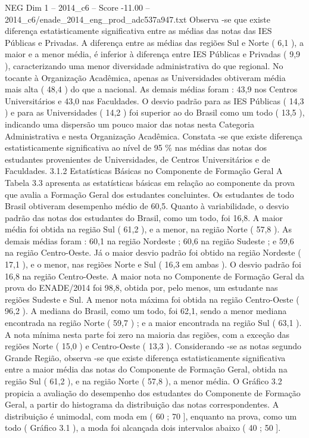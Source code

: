 \begin{textsample}{NEG Dim 1 – 2014\_c6 – Score -11.00 – 2014\_c6/enade\_2014\_eng\_prod\_adc537a947.txt}
Observa -se que existe diferença estatisticamente significativa entre as médias das notas das IES Públicas e Privadas.
A diferença entre as médias das regiões Sul e Norte ( 6,1 ), a maior e a menor média, é inferior à diferença entre IES Públicas e Privadas ( 9,9 ), caracterizando uma menor diversidade administrativa do que regional.
No tocante à Organização Acadêmica, apenas as Universidades obtiveram média mais alta ( 48,4 ) do que a nacional.
As demais médias foram : 43,9 nos Centros Universitários e 43,0 nas Faculdades.
O desvio padrão para as IES Públicas ( 14,3 ) e para as Universidades ( 14,2 ) foi superior ao do Brasil como um todo ( 13,5 ), indicando uma dispersão um pouco maior das notas nesta Categoria Administrativa e nesta Organização Acadêmica.
Constata -se que existe diferença estatisticamente significativa ao nível de 95 \% nas médias das notas dos estudantes provenientes de Universidades, de Centros Universitários e de Faculdades. 3.1.2 Estatísticas Básicas no Componente de Formação Geral A Tabela 3.3 apresenta as estatísticas básicas em relação ao componente da prova que avalia a Formação Geral dos estudantes concluintes.
Os estudantes de todo Brasil obtiveram desempenho médio de 60,5.
Quanto à variabilidade, o desvio padrão das notas dos estudantes do Brasil, como um todo, foi 16,8.
A maior média foi obtida na região Sul ( 61,2 ), e a menor, na região Norte ( 57,8 ).
As demais médias foram : 60,1 na região Nordeste ; 60,6 na região Sudeste ; e 59,6 na região Centro-Oeste.
Já o maior desvio padrão foi obtido na região Nordeste ( 17,1 ), e o menor, nas regiões Norte e Sul ( 16,3 em ambas ).
O desvio padrão foi 16,8 na região Centro-Oeste.
A maior nota no Componente de Formação Geral da prova do ENADE/2014 foi 98,8, obtida por, pelo menos, um estudante nas regiões Sudeste e Sul.
A menor nota máxima foi obtida na região Centro-Oeste ( 96,2 ).
A mediana do Brasil, como um todo, foi 62,1, sendo a menor mediana encontrada na região Norte ( 59,7 ) ; e a maior encontrada na região Sul ( 63,1 ).
A nota mínima nesta parte foi zero na maioria das regiões, com a exceção das regiões Norte ( 15,0 ) e Centro-Oeste ( 13,3 ).
Considerando -se as notas segundo Grande Região, observa -se que existe diferença estatisticamente significativa entre a maior média das notas do Componente de Formação Geral, obtida na região Sul ( 61,2 ), e na região Norte ( 57,8 ), a menor média.
O Gráfico 3.2 propicia a avaliação do desempenho dos estudantes do Componente de Formação Geral, a partir do histograma da distribuição das notas correspondentes.
A distribuição é unimodal, com moda em ( 60 ; 70 ], enquanto na prova, como um todo ( Gráfico 3.1 ), a moda foi alcançada dois intervalos abaixo ( 40 ; 50 ].

\end{textsample}

